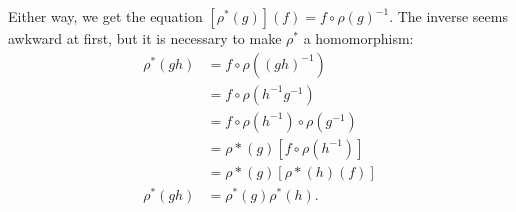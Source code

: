 \documentclass[12pt]{article}
\newcommand\inv[1]{#1^{-1}}
\theoremstyle{definition}
\begin{document}
Either way, we get the equation $\left[ \rho^*(g) \right](f) = f \circ \inv{\rho(g)}$. The inverse seems awkward at first, but it is necessary to make $\rho^*$ a homomorphism:
\begin{equation}
    \begin{split}
        \rho^*(gh) & = f \circ \rho \left( \inv{(gh)} \right) \\
        & = f \circ \rho \left( \inv{h} \inv{g} \right) \\
        & = f \circ \rho \left( \inv{h} \right) \circ \rho \left( \inv{g} \right) \\
        & = \rho*(g) \left[ f \circ \rho \left( \inv{h} \right) \right] \\
        & = \rho*(g) \left[ \rho*(h) (f) \right] \\
        \rho^*(gh) & = \rho^*(g) \rho^*(h).
    \end{split}
\end{equation}
\end{document}

